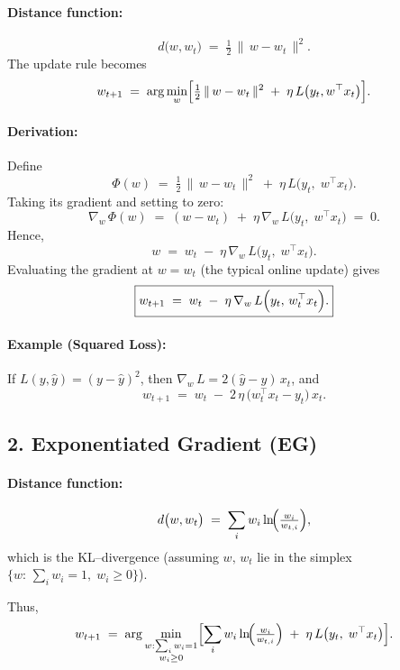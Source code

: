 \documentclass{article}
\begin{document}
\paragraph{Distance function:} 
\[
  d\bigl(w, w_t\bigr) 
  \;=\;
  \tfrac12\,\|\,w - w_t\,\|^2.
\]
The update rule becomes
\[
  w_{t+1}
  \;=\;
  \arg\min_{w} 
  \Bigl[
    \tfrac12\,\|\,w - w_t\,\|^2
    \;+\;
    \eta\,L\bigl(y_t, w^\top x_t\bigr)
  \Bigr].
\]

\paragraph{Derivation:}
Define
\[
  \Phi(w)
  \;=\;
  \tfrac12\,\|\,w - w_t\,\|^2
  \;+\;
  \eta\,L\bigl(y_t,\;w^\top x_t\bigr).
\]
Taking its gradient and setting to zero:
\[
  \nabla_{w}\,\Phi(w)
  \;=\;
  (w - w_t)
  \;+\;
  \eta\,\nabla_{w}\,L\bigl(y_t,\;w^\top x_t\bigr)
  \;=\;0.
\]
Hence,
\[
  w
  \;=\;
  w_t
  \;-\;
  \eta\,\nabla_{w}\,L\bigl(y_t,\;w^\top x_t\bigr).
\]
Evaluating the gradient at $w = w_t$ (the typical online update) gives
\[
  \boxed{
    w_{t+1}
    \;=\;
    w_{t}
    \;-\;
    \eta\,\nabla_{w}\,L\Bigl(y_t,\,w_t^\top x_t\Bigr).
  }
\]

\paragraph{Example (Squared Loss):}
If $L(y,\hat{y}) = (y-\hat{y})^2$, then 
$\nabla_{w}\,L = 2(\hat{y}-y)\,x_t$, and 
\[
  w_{t+1}
  \;=\;
  w_t
  \;-\;
  2\,\eta\,\bigl(w_t^\top x_t - y_t\bigr)\,x_t.
\]

\subsection*{2. Exponentiated Gradient (EG)}

\paragraph{Distance function:}
\[
  d\bigl(w,w_t\bigr)
  \;=\;
  \sum_{i} w_i \ln\!\Bigl(\tfrac{w_i}{w_{t,i}}\Bigr),
\]
which is the KL--divergence (assuming $w,\,w_t$ lie in the simplex $\{w:\,\sum_i w_i=1,\;w_i\ge0\}$).

Thus,
\[
  w_{t+1}
  \;=\;
  \arg\min_{\substack{w:\sum_i w_i=1\\w_i\ge0}} 
  \Bigl[
    \sum_{i} w_i \ln\!\Bigl(\tfrac{w_i}{w_{t,i}}\Bigr)
    \;+\;
    \eta\,L\bigl(y_t,\;w^\top x_t\bigr)
  \Bigr].
\]
\end{document}
